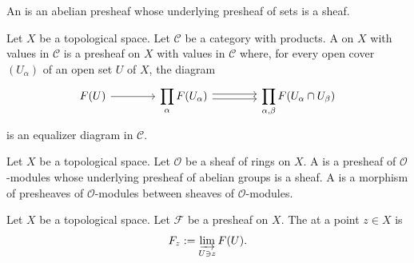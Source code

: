 \documentclass [11 pt, oneside] {article}
\begin{document}
\begin{definition}[ ]\label{}\text{}
An  is an abelian presheaf whose underlying presheaf of sets is a sheaf.
\end{definition}


\begin{definition}\label{}\text{}
Let $X$ be a topological space. Let $\mathscr{C}$ be a category with products. A  on $X$ with values in $\mathscr{C}$ is a presheaf on $X$ with values in $\mathscr{C}$ where, for every open cover $(U_{\alpha})$ of an open set $U$ of $X$, the diagram
\[
\begin{tikzcd}[column sep = 4 em]
	\mathscr{F}(U) \ar[r] & \displaystyle \prod_{\alpha} \mathscr{F}(U_{\alpha}) \ar[r,shift left = 0.5 ex] \ar[r, shift right = 0.5 ex] &\displaystyle \prod_{\alpha,\beta} \mathscr{F}(U_{\alpha}\cap U_{\beta})
\end{tikzcd}
\]
is an equalizer diagram in $\mathscr{C}$.
\end{definition}

\begin{definition}\label{}\text{}
Let $X$ be a topological space. Let $\mathscr{O}$ be a sheaf of rings on $X$. A  is a presheaf of $\mathscr{O}$-modules whose underlying presheaf of abelian groups is a sheaf. A  is a morphism of presheaves of $\mathscr{O}$-modules between sheaves of $\mathscr{O}$-modules.
\end{definition}

\begin{definition}[ ]\label{}\text{}
Let $X$ be a topological space. Let $\mathscr{F}$ be a presheaf on $X$. The  at a point $z\in X$ is
\begin{align*}
	\mathscr{F}_{z} := \varinjlim_{U\ni z} \mathscr{F}(U).
\end{align*}
\end{definition}
\end{document}
